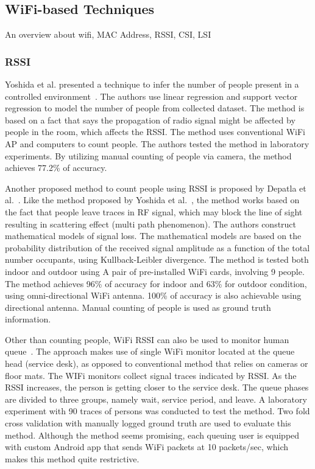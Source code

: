 	\subsection{WiFi-based Techniques} %
	\label{sub:wifi-based-techniques}
	An overview about wifi, MAC Address, RSSI, CSI, LSI


	\subsubsection{RSSI} %
	\label{ssub:rssi}
	Yoshida et al. presented a technique to infer the number of people present in a controlled environment~\cite{thesis052}. The authors use linear regression and support vector regression to model the number of people from collected dataset. The method is based on a fact that says the propagation of radio signal might be affected by people in the room, which affects the \ac{RSSI}. The method uses conventional WiFi \ac{AP} and computers to count people. The authors tested the method in laboratory experiments. By utilizing manual counting of people via camera, the method achieves 77.2\% of accuracy.	

	Another proposed method to count people using \ac{RSSI} is proposed by Depatla et al.~\cite{thesis046}. Like the method proposed by Yoshida et al.~\cite{thesis052}, the method works based on the fact that people leave traces in \ac{RF} signal, which may block the line of sight resulting in scattering effect (multi path phenomenon). The authors construct mathematical models of signal loss. The mathematical models are based on the probability distribution of the received signal amplitude as a function of the total number occupants, using Kullback-Leibler divergence. The method is tested both indoor and outdoor using A pair of pre-installed WiFi cards, involving 9 people. The method achieves 96\% of accuracy for indoor and 63\% for outdoor condition, using omni-directional WiFi antenna. 100\% of accuracy is also achievable using directional antenna. Manual counting of people is used as ground truth information.

	Other than counting people, WiFi \ac{RSSI} can also be used to monitor human queue~\cite{thesis012}. The approach makes use of single WiFi monitor located at the queue head (service desk), as opposed to conventional method that relies on cameras or floor mats. The WIFi monitors collect signal traces indicated by \ac{RSSI}. As the \ac{RSSI} increases, the person is getting closer to the service desk. The queue phases are divided to three groups, namely wait, service period, and leave. A laboratory experiment with 90 traces of persons was conducted to test the method. Two fold cross validation with manually logged ground truth are used to evaluate this method. Although the method seems promising, each queuing user is equipped with custom Android app that sends WiFi packets at 10 packets/sec, which makes this method quite restrictive.

